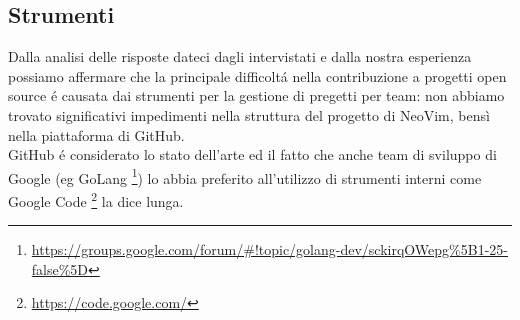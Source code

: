 \documentclass[12pt]{article} %
\begin{document}
\subsection{Strumenti}
Dalla analisi delle risposte dateci dagli intervistati e dalla nostra esperienza possiamo affermare che la principale difficolt\'a nella contribuzione a progetti open source \'e causata dai strumenti per la gestione di pregetti per team: non abbiamo trovato significativi impedimenti nella struttura del progetto di NeoVim, bensì nella piattaforma di GitHub.\\
GitHub \'e considerato lo stato dell'arte ed il fatto che anche team di sviluppo di Google (eg GoLang \footnote{\url{https://groups.google.com/forum/#!topic/golang-dev/sckirqOWepg\%5B1-25-false\%5D}}) lo abbia preferito all'utilizzo di strumenti interni come Google Code \footnote{\url{https://code.google.com/}} la dice lunga.

\cite{*}

\newpage


\end{document}
